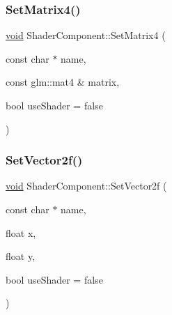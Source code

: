 \mbox{\label{classShaderComponent_ae8dcaeeff884867548d48327dbd21f13}} 
\subsubsection{\texorpdfstring{Set\+Matrix4()}{SetMatrix4()}}
{\footnotesize\ttfamily \hyperlink{imgui__impl__opengl3__loader_8h_ac668e7cffd9e2e9cfee428b9b2f34fa7}{void} Shader\+Component\+::\+Set\+Matrix4 (\begin{DoxyParamCaption}\item[{const char $\ast$}]{name,  }\item[{const glm\+::mat4 \&}]{matrix,  }\item[{bool}]{use\+Shader = {\ttfamily false} }\end{DoxyParamCaption})}

\mbox{\label{classShaderComponent_a3d1a69de59f69c7b319f08639764a716}} 
\subsubsection{\texorpdfstring{Set\+Vector2f()}{SetVector2f()}\hspace{0.1cm}{\footnotesize\ttfamily [1/2]}}
{\footnotesize\ttfamily \hyperlink{imgui__impl__opengl3__loader_8h_ac668e7cffd9e2e9cfee428b9b2f34fa7}{void} Shader\+Component\+::\+Set\+Vector2f (\begin{DoxyParamCaption}\item[{const char $\ast$}]{name,  }\item[{float}]{x,  }\item[{float}]{y,  }\item[{bool}]{use\+Shader = {\ttfamily false} }\end{DoxyParamCaption})}

\mbox{\label{classShaderComponent_af5e317ce56405fadb5c62d178c3f2420}} 
